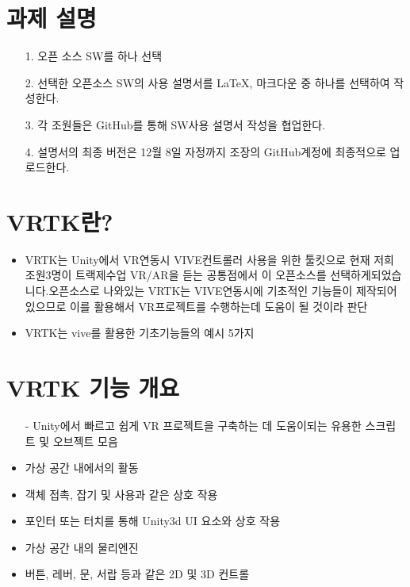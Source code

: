 \documentclass{report}
\begin{document}
    \section {과제 설명}
    \begin{itemize}
        \item [1.] 오픈 소스 SW를 하나 선택

        \item [2.] 선택한 오픈소스 SW의 사용 설명서를 LaTeX, 마크다운 중 하나를 선택하여 작성한다.

        \item [3.] 각 조원들은 GitHub를 통해 SW사용 설명서 작성을 협업한다.

        \item [4.] 설명서의 최종 버전은  12월 8일 자정까지 조장의 GitHub계정에 최종적으로 업로드한다.
    \end{itemize}
    \section {VRTK란?}
    
    \begin{itemize}
    
    \item VRTK는 Unity에서 VR연동시 VIVE컨트롤러 사용을 위한 툴킷으로 현재 저희 조원3명이 트랙제수업 VR/AR을 듣는 공통점에서 이 오픈소스를 선택하게되었습니다.오픈소스로 나와있는 VRTK는 VIVE연동시에 기초적인 기능들이 제작되어있으므로 이를 활용해서 VR프로젝트를 수행하는데 도움이 될 것이라 판단
    
    \item VRTK는 vive를 활용한 기초기능들의 예시 5가지

    \end{itemize}
    
    \section {VRTK 기능 개요}
    
    \begin{itemize}
    
    \item[-] Unity에서 빠르고 쉽게 VR 프로젝트을 구축하는 데 도움이되는 유용한 스크립트 및 오브젝트 모음

    \item 가상 공간 내에서의 활동
    \item 객체 접촉, 잡기 및 사용과 같은 상호 작용
    \item 포인터 또는 터치를 통해 Unity3d UI 요소와 상호 작용
    \item 가상 공간 내의 물리엔진
    \item 버튼, 레버, 문, 서랍 등과 같은 2D 및 3D 컨트롤

    \end{itemize}
    
\end{document}
